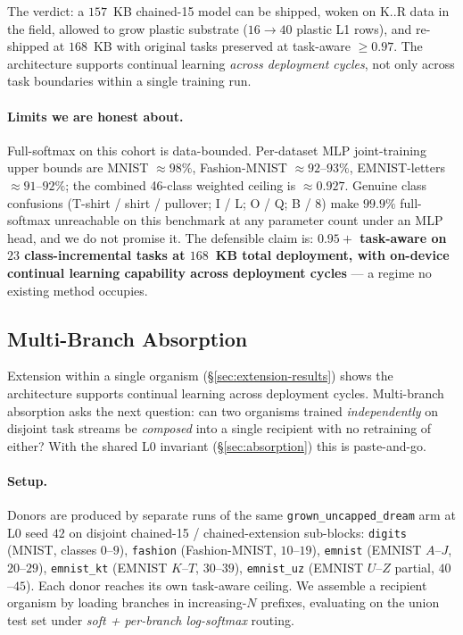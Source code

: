 \documentclass[11pt]{article}
\newcommand{\arm}[1]{\texttt{#1}}
\begin{document}
The verdict: a $157$~KB chained-15 model can be shipped, woken on K..R
data in the field, allowed to grow plastic substrate ($16 \to 40$ plastic
L1 rows), and re-shipped at $168$~KB with original tasks preserved at
task-aware $\geq 0.97$. The architecture supports continual learning
\emph{across deployment cycles}, not only across task boundaries within a
single training run.

\paragraph{Limits we are honest about.}
Full-softmax on this cohort is data-bounded. Per-dataset MLP joint-training
upper bounds are MNIST $\approx 98\%$, Fashion-MNIST $\approx 92$--$93\%$,
EMNIST-letters $\approx 91$--$92\%$; the combined 46-class weighted ceiling
is $\approx 0.927$. Genuine class confusions (T-shirt / shirt / pullover;
I / L; O / Q; B / 8) make $99.9\%$ full-softmax unreachable on this
benchmark at any parameter count under an MLP head, and we do not promise
it. The defensible claim is: \textbf{$0.95+$ task-aware on $23$
class-incremental tasks at $168$~KB total deployment, with on-device
continual learning capability across deployment cycles} --- a regime no
existing method occupies.

\subsection{Multi-Branch Absorption}
\label{sec:absorption-results}

Extension within a single organism (\S\ref{sec:extension-results}) shows
the architecture supports continual learning across deployment cycles.
Multi-branch absorption asks the next question: can two organisms
trained \emph{independently} on disjoint task streams be \emph{composed}
into a single recipient with no retraining of either? With the shared
L0 invariant (\S\ref{sec:absorption}) this is paste-and-go.

\paragraph{Setup.} Donors are produced by separate runs of the same
\arm{grown\_uncapped\_dream} arm at L0 seed $42$ on disjoint
chained-15 / chained-extension sub-blocks: \arm{digits} (MNIST,
classes $0$--$9$), \arm{fashion} (Fashion-MNIST, $10$--$19$),
\arm{emnist} (EMNIST $A$--$J$, $20$--$29$), \arm{emnist\_kt} (EMNIST
$K$--$T$, $30$--$39$), \arm{emnist\_uz} (EMNIST $U$--$Z$ partial,
$40$--$45$). Each donor reaches its own task-aware ceiling. We assemble
a recipient organism by loading branches in increasing-$N$ prefixes,
evaluating on the union test set under \emph{soft + per-branch
log-softmax} routing.
\end{document}
